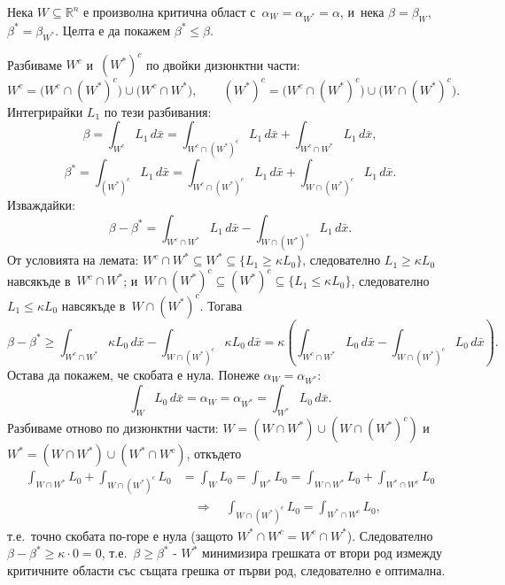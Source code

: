 \begin{proofbox}
Нека $W\subseteq\mathbb R^n$ е произволна критична област с~$\alpha_W
=\alpha_{W^*}=\alpha$, и~нека $\beta=\beta_W$, $\beta^*=\beta_{W^*}$.
Целта е да покажем $\beta^*\le\beta$.

Разбиваме $W^c$ и~$(W^*)^c$ по двойки дизюнктни части:
\[
  W^c = \big(W^c\cap(W^*)^c\big)\cup\big(W^c\cap W^*\big),
  \qquad
  (W^*)^c = \big(W^c\cap(W^*)^c\big)\cup\big(W\cap(W^*)^c\big).
\]
Интегрирайки $L_1$ по тези разбивания:
\[
  \beta = \int_{W^c} L_1\,d\bar x = \int_{W^c\cap(W^*)^c}L_1\,d\bar x + \int_{W^c\cap W^*}L_1\,d\bar x,
\]
\[
  \beta^* = \int_{(W^*)^c}L_1\,d\bar x = \int_{W^c\cap(W^*)^c}L_1\,d\bar x + \int_{W\cap(W^*)^c}L_1\,d\bar x.
\]
Изваждайки:
\[
  \beta - \beta^* = \int_{W^c\cap W^*}L_1\,d\bar x - \int_{W\cap(W^*)^c}L_1\,d\bar x.
\]
От условията на лемата: $W^c\cap W^*\subseteq W^*\subseteq\{L_1\ge
\kappa L_0\}$, следователно $L_1\ge\kappa L_0$ навсякъде в~$W^c\cap
W^*$; и~$W\cap(W^*)^c\subseteq(W^*)^c\subseteq\{L_1\le\kappa L_0\}$,
следователно $L_1\le\kappa L_0$ навсякъде в~$W\cap(W^*)^c$. Тогава
\[
  \beta-\beta^* \ge \int_{W^c\cap W^*}\kappa L_0\,d\bar x - \int_{W\cap(W^*)^c}\kappa L_0\,d\bar x = \kappa\left(\int_{W^c\cap W^*}L_0\,d\bar x - \int_{W\cap(W^*)^c}L_0\,d\bar x\right).
\]
Остава да покажем, че скобата е нула. Понеже $\alpha_W=\alpha_{W^*}$:
\[
  \int_W L_0\,d\bar x = \alpha_W = \alpha_{W^*} = \int_{W^*}L_0\,d\bar x.
\]
Разбиваме отново по дизюнктни части: $W=(W\cap W^*)\cup(W\cap
(W^*)^c)$ и~$W^*=(W\cap W^*)\cup(W^*\cap W^c)$, откъдето
\begin{align*}
  \int_{W\cap W^*}L_0 + \int_{W\cap(W^*)^c}L_0 &= \int_W L_0 = \int_{W^*}L_0 = \int_{W\cap W^*}L_0 + \int_{W^*\cap W^c}L_0\\
  &\quad\Longrightarrow\quad \int_{W\cap(W^*)^c}L_0 = \int_{W^*\cap W^c}L_0,
\end{align*}
т.е.\ точно скобата по-горе е нула (защото $W^*\cap W^c=W^c\cap
W^*$). Следователно $\beta-\beta^*\ge\kappa\cdot0=0$, т.е.\
$\beta\ge\beta^*$ - $W^*$ минимизира грешката от втори род измежду
критичните области със същата грешка от първи род, следователно е
оптимална. \qedbg
\end{proofbox}
